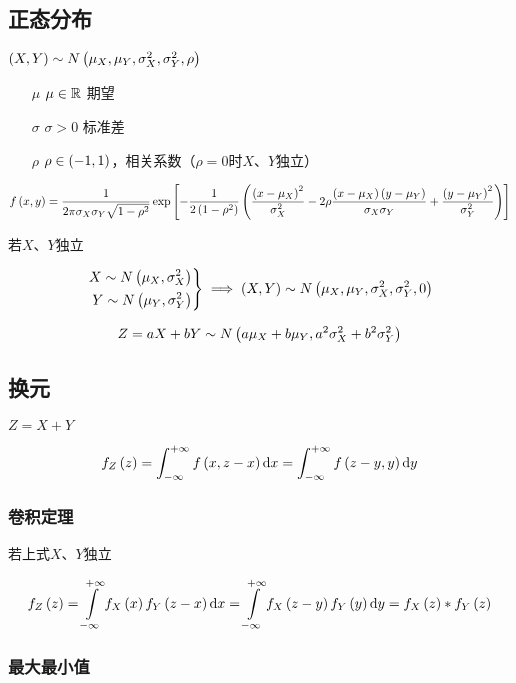 \documentclass{article}
\begin{document}
\subsection{正态分布}

$\left(X,Y\right)\sim N\left(\mu_X,\mu_Y,\sigma_X^2,\sigma_Y^2,\rho\right)$

\begin{enumerate}
    \item [$\mu$] $\mu\in\mathbb R$ 期望
    \item [$\sigma$] $\sigma>0$ 标准差
    \item [$\rho$] $\rho\in\left(-1,1\right)$，相关系数（$\rho=0$时$X$、$Y$独立）
\end{enumerate}

\[f\left(x,y\right)=\frac1{2\pi\sigma_X\sigma_Y\sqrt{1-\rho^2}}
    \exp\left[-\frac1{2\left(1-\rho^2\right)}
        \left(\frac{{\left(x-\mu_X\right)}^2}{\sigma_X^2}
            -2\rho\frac{\left(x-\mu_X\right)\left(y-\mu_Y\right)}{\sigma_X\sigma_Y}
            +\frac{{\left(y-\mu_Y\right)}^2}{\sigma_Y^2}\right)\right]\]

若$X$、$Y$独立

\[\left.\begin{aligned}
        X\sim N\left(\mu_X,\sigma_X^2\right) \\
        Y\sim N\left(\mu_Y,\sigma_Y^2\right)
    \end{aligned}\right\}\implies
    \left(X,Y\right)\sim N\left(\mu_X,\mu_Y,\sigma_X^2,\sigma_Y^2,0\right)\]


\[Z=aX+bY\sim N\left(a\mu_X+b\mu_Y,a^2\sigma_X^2+b^2\sigma_Y^2\right)\]

\subsection{换元}

$Z=X+Y$

\[f_Z\left(z\right)
    =\int_{-\infty}^{+\infty}f\left(x,z-x\right)\mathrm d x
    =\int_{-\infty}^{+\infty}f\left(z-y,y\right)\mathrm d y\]

\subsubsection{卷积定理}

若上式$X$、$Y$独立

\[f_Z\left(z\right)
    =\int\limits_{-\infty}^{+\infty} f_X\left(x\right)f_Y\left(z-x\right)\mathrm d x
    =\int\limits_{-\infty}^{+\infty} f_X\left(z-y\right)f_Y\left(y\right)\mathrm d y
    =f_X\left(z\right)\ast f_Y\left(z\right)\]

\subsubsection{最大最小值}
\end{document}
